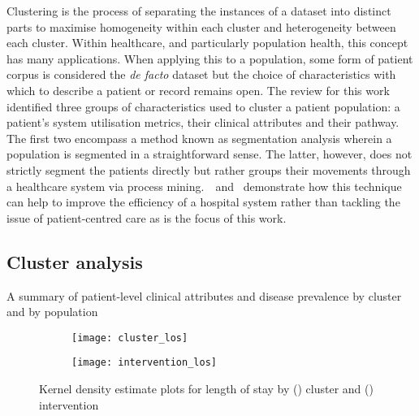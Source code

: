 Clustering is the process of separating the instances of a dataset into distinct
parts to maximise homogeneity within each cluster and heterogeneity
between each cluster. Within healthcare, and particularly population health,
this concept has many applications. When applying this to a population, some
form of patient corpus is considered the \emph{de facto} dataset but the choice
of characteristics with which to describe a patient or record remains
open. The review for this work identified three groups of characteristics used
to cluster a patient population: a patient's system utilisation metrics, their
clinical attributes and their pathway. The first two encompass a method known as
segmentation analysis wherein a population is segmented in a straightforward
sense. The latter, however, does not strictly segment the patients directly
but rather groups their movements through a healthcare system via process
mining.~\cite{AG2018}~and~\cite{DDGM+12015} demonstrate how this technique can
help to improve the efficiency of a hospital system rather than tackling the
issue of patient-centred care as is the focus of this work.


\subsection{Cluster analysis}\label{subsec:clusters}

\begin{table}
    \centering
    \resizebox{\textwidth}{!}{%
        
    }\caption{A summary of patient-level clinical attributes and disease
    prevalence by cluster and by population}\label{tab:summary}
\end{table}

\begin{figure}
    \centering
    \begin{subfigure}{\halfimgwidth}
        \texttt{[image: cluster\_los]}
        \caption{}\label{fig:cluster_los}
    \end{subfigure}\hfill%
    \begin{subfigure}{\halfimgwidth}
        \texttt{[image: intervention\_los]}
        \caption{}\label{fig:intervention_los}
    \end{subfigure}
    \caption{%
        Kernel density estimate plots for length of stay by
        () cluster and ()
        intervention
    }\label{fig:los_kde}
\end{figure}

